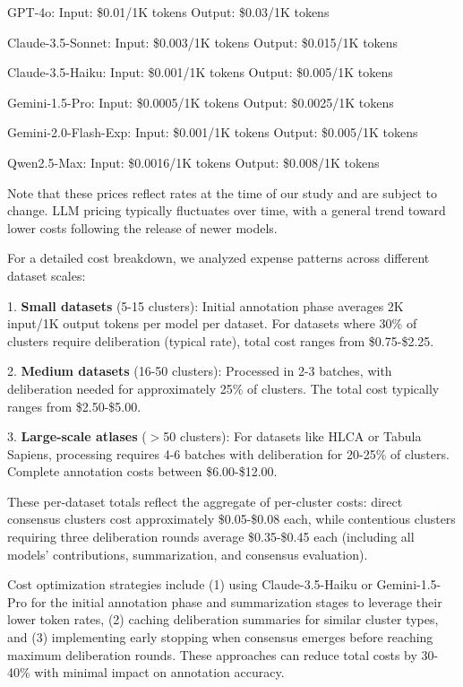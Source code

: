 \documentclass[pdflatex,sn-nature]{sn-jnl}%
\theoremstyle{thmstyleone}%
\theoremstyle{thmstyletwo}%
\theoremstyle{thmstylethree}%
\begin{document}
GPT-4o:
Input: \$0.01/1K tokens
Output: \$0.03/1K tokens

Claude-3.5-Sonnet:
Input: \$0.003/1K tokens
Output: \$0.015/1K tokens

Claude-3.5-Haiku:
Input: \$0.001/1K tokens
Output: \$0.005/1K tokens

Gemini-1.5-Pro:
Input: \$0.0005/1K tokens
Output: \$0.0025/1K tokens

Gemini-2.0-Flash-Exp:
Input: \$0.001/1K tokens
Output: \$0.005/1K tokens

Qwen2.5-Max:
Input: \$0.0016/1K tokens
Output: \$0.008/1K tokens

Note that these prices reflect rates at the time of our study and are subject to change. LLM pricing typically fluctuates over time, with a general trend toward lower costs following the release of newer models.

For a detailed cost breakdown, we analyzed expense patterns across different dataset scales:

1. \textbf{Small datasets} (5-15 clusters): Initial annotation phase averages 2K input/1K output tokens per model per dataset. For datasets where 30\% of clusters require deliberation (typical rate), total cost ranges from \$0.75-\$2.25.

2. \textbf{Medium datasets} (16-50 clusters): Processed in 2-3 batches, with deliberation needed for approximately 25\% of clusters. The total cost typically ranges from \$2.50-\$5.00.

3. \textbf{Large-scale atlases} ($>$50 clusters): For datasets like HLCA or Tabula Sapiens, processing requires 4-6 batches with deliberation for 20-25\% of clusters. Complete annotation costs between \$6.00-\$12.00.

These per-dataset totals reflect the aggregate of per-cluster costs: direct consensus clusters cost approximately \$0.05-\$0.08 each, while contentious clusters requiring three deliberation rounds average \$0.35-\$0.45 each (including all models' contributions, summarization, and consensus evaluation).

Cost optimization strategies include (1) using Claude-3.5-Haiku or Gemini-1.5-Pro for the initial annotation phase and summarization stages to leverage their lower token rates, (2) caching deliberation summaries for similar cluster types, and (3) implementing early stopping when consensus emerges before reaching maximum deliberation rounds. These approaches can reduce total costs by 30-40\% with minimal impact on annotation accuracy.
\end{document}
